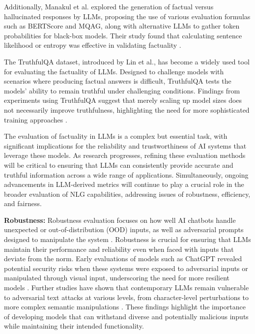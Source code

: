 Additionally, Manakul et al. explored the generation of factual versus hallucinated responses by LLMs, proposing the use of various evaluation formulas such as BERTScore and MQAG, along with alternative LLMs to gather token probabilities for black-box models. Their study found that calculating sentence likelihood or entropy was effective in validating factuality \cite{manakul2023selfcheckgpt}.

The TruthfulQA dataset, introduced by Lin et al., has become a widely used tool for evaluating the factuality of LLMs. Designed to challenge models with scenarios where producing factual answers is difficult, TruthfulQA tests the models' ability to remain truthful under challenging conditions. Findings from experiments using TruthfulQA suggest that merely scaling up model sizes does not necessarily improve truthfulness, highlighting the need for more sophisticated training approaches \cite{lin2021truthfulqa}.

The evaluation of factuality in LLMs is a complex but essential task, with significant implications for the reliability and trustworthiness of AI systems that leverage these models. As research progresses, refining these evaluation methods will be critical to ensuring that LLMs can consistently provide accurate and truthful information across a wide range of applications. Simultaneously, ongoing advancements in LLM-derived metrics will continue to play a crucial role in the broader evaluation of NLG capabilities, addressing issues of robustness, efficiency, and fairness.

\textbf{Robustness:} Robustness evaluation focuses on how well AI chatbots handle unexpected or out-of-distribution (OOD) inputs, as well as adversarial prompts designed to manipulate the system \cite{wang2022generalizing}. Robustness is crucial for ensuring that LLMs maintain their performance and reliability even when faced with inputs that deviate from the norm. Early evaluations of models such as ChatGPT revealed potential security risks when these systems were exposed to adversarial inputs or manipulated through visual input, underscoring the need for more resilient models \cite{yang2022glue}. Further studies have shown that contemporary LLMs remain vulnerable to adversarial text attacks at various levels, from character-level perturbations to more complex semantic manipulations \cite{zhu2023promptbench}. These findings highlight the importance of developing models that can withstand diverse and potentially malicious inputs while maintaining their intended functionality.

